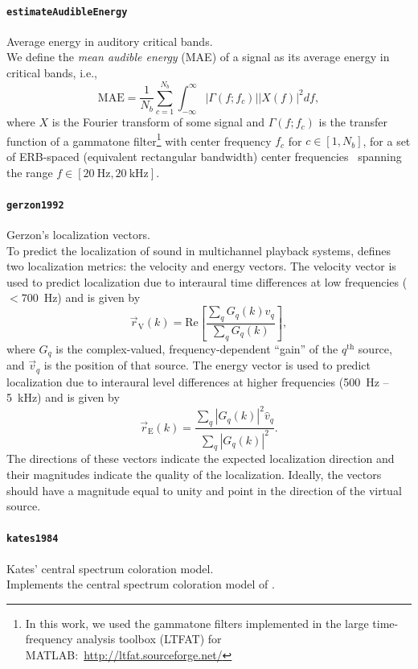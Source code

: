 \documentclass[11pt, oneside]{article}
\newcommand{\function}[1]{\paragraph*{\texttt{#1}}}
\begin{document}
\function{estimateAudibleEnergy} Average energy in auditory critical bands. \\
We define the \textit{mean audible energy} (MAE) of a signal as its average energy in critical bands, i.e.,
\begin{equation}\label{eq:estimateAudibleEnergy}
\text{MAE} = \frac{1}{N_b} \sum_{c = 1}^{N_b} \int_{-\infty}^\infty |\Gamma(f;f_c)| |X(f)|^2 df,
\end{equation}
where $X$ is the Fourier transform of some signal and $\Gamma(f;f_c)$ is the transfer function of a gammatone filter\footnote{In this work, we used the gammatone filters implemented in the large time-frequency analysis toolbox (LTFAT) for MATLAB:~\url{http://ltfat.sourceforge.net/}} with center frequency $f_c$ for $c \in [1, N_b]$, for a set of ERB-spaced (equivalent rectangular bandwidth) center frequencies~\citep{GlasbergMoore1990} spanning the range $f \in [20~\text{Hz}, 20~\text{kHz}]$.

\function{gerzon1992} Gerzon's localization vectors. \\
To predict the localization of sound in multichannel playback systems, \citet{Gerzon1992} defines two localization metrics: the velocity and energy vectors.
The velocity vector is used to predict localization due to interaural time differences at low frequencies ($<700$~Hz) and is given by \cite{Gerzon1992}
\begin{equation}\label{eq:gerzon1992_rV}
\vec{r}_{\text{V}}(k) = \textrm{Re} \left[ \frac{ \sum_q G_q(k) \hat{v}_q}{ \sum_q G_q(k)} \right],
\end{equation}
where $G_q$ is the complex-valued, frequency-dependent ``gain'' of the $q^{\text{th}}$ source, and $\vec{v}_q$ is the position of that source.
The energy vector is used to predict localization due to interaural level differences at higher frequencies (500~Hz -- 5~kHz) and is given by~\cite{Gerzon1992}
\begin{equation}\label{eq:gerzon1992_rE}
\vec{r}_{\text{E}}(k) = \frac{ \sum_q |G_q(k)|^2 \hat{v}_q}{ \sum_q |G_q(k)|^2}.
\end{equation}
The directions of these vectors indicate the expected localization direction and their magnitudes indicate the quality of the localization.
Ideally, the vectors should have a magnitude equal to unity and point in the direction of the virtual source.

\function{kates1984} Kates' central spectrum coloration model. \\
Implements the central spectrum coloration model of \citet{Kates1984}.
\end{document}
